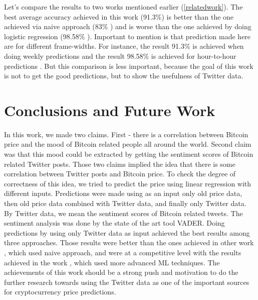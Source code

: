\documentclass[a4paper,11pt,oneside]{article}
\begin{document}
  Let's compare the results to two works mentioned earlier (\ref{relatedwork}). The best average accuracy achieved in this work (91.3\%) is better than the one achieved via naive approach (83\% \cite{related1}) and is worse than the one achieved by doing logistic regression (98.58\% \cite{related2}). Important to mention is that prediction made here are for different frame-widths. For instance, the result 91.3\% is achieved when doing weekly predictions and the result 98.58\% is achieved for hour-to-hour predictions \cite{related2}. But this comparison is less important, because the goal of this work is not to get the good predictions, but to show the usefulness of Twitter data.
  
  \section{Conclusions and Future Work}

  In this work, we made two claims. First - there is a correlation between Bitcoin price and the mood of Bitcoin related people all around the world. Second claim was that this mood could be extracted by getting the sentiment scores of Bitcoin related Twitter posts. Those two claims implied the idea that there is some correlation between Twitter posts and Bitcoin price. To check the degree of correctness of this idea, we tried to predict the price using linear regression with different inputs. Predictions were made using as an input only old price data, then old price data combined with Twitter data, and finally only Twitter data. By Twitter data, we mean the sentiment scores of Bitcoin related tweets. The sentiment analysis was done by the state of the art tool VADER. Doing predictions by using only Twitter data as input achieved the best results among three approaches. Those results were better than the ones achieved in other work \cite{related1}, which used naive approach, and were at a competitive level with the results achieved in the work \cite{related2}, which used more advanced ML techniques. The achievements of this work should be a strong push and motivation to do the further research towards using the Twitter data as one of the important sources for cryptocurrency price predictions.
  
\end{document}
